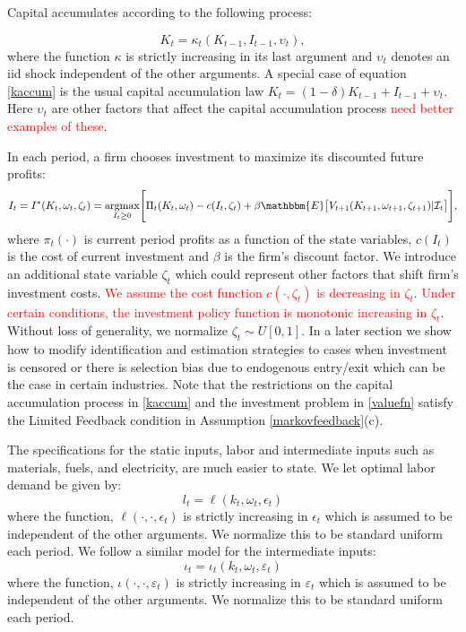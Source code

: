 \documentclass{article}
\begin{document}
Capital accumulates according to the following process:

\begin{equation} \label{kaccum}
K_{t}=\kappa_{t}(K_{t-1}, I_{t-1}, \upsilon_{t}),
\end{equation}
where the function $\kappa$ is strictly increasing in its last argument and $\upsilon_{t}$ denotes an iid shock independent of the other arguments. A special case of equation \eqref{kaccum} is the usual capital accumulation law $K_{t}=(1-\delta)K_{t-1}+I_{t-1}+\upsilon_{t}$. Here $\upsilon_{t}$ are other factors that affect the capital accumulation process \textcolor{red}{need better examples of these}.

In each period, a firm chooses investment to maximize its discounted future profits:
\begin{equation} \label{valuefn}
I_{t}=I^{*}(K_{t}, \omega_{t}, \zeta_{t})=\underset{I_{t}\geq 0}{\operatorname{argmax}}\Bigg[\Pi_{t}(K_{t}, \omega_{t})-c(I_{t}, \zeta_{t})+\beta\mathbbm{E}\big[V_{t+1}(K_{t+1}, \omega_{t+1}, \zeta_{t+1})|\mathcal{I}_{t}\big]\Bigg],
\end{equation}
where $\pi_{t}(\cdot)$ is current period profits as a function of the state variables, $c(I_{t})$ is the cost of current investment and $\beta$ is the firm's discount factor. We introduce an additional state variable $\zeta_{t}$ which could represent other factors that shift firm's investment costs. \textcolor{red}{We assume the cost function $c(\cdot, \zeta_{t})$ is decreasing in $\zeta_{t}$}. \textcolor{red}{Under certain conditions, the investment policy function is monotonic increasing in $\zeta_{t}$}. Without loss of generality, we normalize $\zeta_{t}\sim U[0,1]$. In a later section we show how to modify identification and estimation strategies to cases when investment is censored or there is selection bias due to endogenous entry/exit which can be the case in certain industries. Note that the restrictions on the capital accumulation process in \eqref{kaccum} and the investment problem in \eqref{valuefn} satisfy the Limited Feedback condition in Assumption \eqref{markovfeedback}(c).

The specifications for the static inputs, labor and intermediate inputs such as materials, fuels, and electricity, are much easier to state. We let optimal labor demand be given by:
\begin{equation} \label{labordemand}
l_{t}=\ell(k_{t}, \omega_{t}, \epsilon_{t})
\end{equation}
where the function, $\ell(\cdot, \cdot, \epsilon_{t})$ is strictly increasing in $\epsilon_{t}$ which is assumed to be independent of the other arguments. We normalize this to be standard uniform each period. We follow a similar model for the intermediate inputs:
\begin{equation} \label{intdemand}
\iota_{t}=\iota_{t}(k_{t}, \omega_{t}, \varepsilon_{t})
\end{equation}
where the function, $\iota(\cdot, \cdot, \varepsilon_{t})$ is strictly increasing in $\varepsilon_{t}$ which is assumed to be independent of the other arguments. We normalize this to be standard uniform each period.
\end{document}
